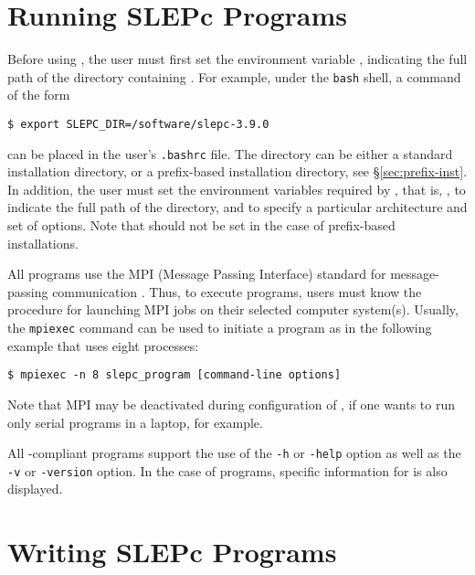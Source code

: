 
\section{Running SLEPc Programs}

Before using \slepc, the user must first set the environment variable
, indicating the full path of the directory containing \slepc. For example, under the \texttt{bash} shell, a command of the form
	\begin{Verbatim}[fontsize=\small]
	$ export SLEPC_DIR=/software/slepc-3.9.0
	\end{Verbatim}
can be placed in the user's \Verb!.bashrc! file.
The  directory can be either a standard installation \slepc directory, or a prefix-based installation directory, see \S\ref{sec:prefix-inst}.
In addition, the user must set the environment variables required by \petsc, that is, , to indicate the full path of the \petsc directory, and  to specify a particular architecture and set of options. Note that  should not be set in the case of prefix-based installations.

All \petsc programs use the MPI (Message Passing Interface) standard
for message-passing communication \citep{MPI-Forum:1994:MMI}.  Thus, to execute
\slepc programs, users must know the procedure for launching MPI jobs
on their selected computer system(s).  Usually, the \texttt{mpiexec} command can be used to initiate a program as in the following example that uses eight processes:
	\begin{Verbatim}[fontsize=\small]
	$ mpiexec -n 8 slepc_program [command-line options]
	\end{Verbatim}
Note that MPI may be deactivated during configuration of \petsc, if one wants to run only serial programs in a laptop, for example.

All \petsc-compliant programs support the use of the \Verb!-h!
or \Verb!-help! option as well as the \Verb!-v! or \Verb!-version! option. In the case of \slepc programs, specific information for \slepc is also displayed.

\section{Writing SLEPc Programs}

